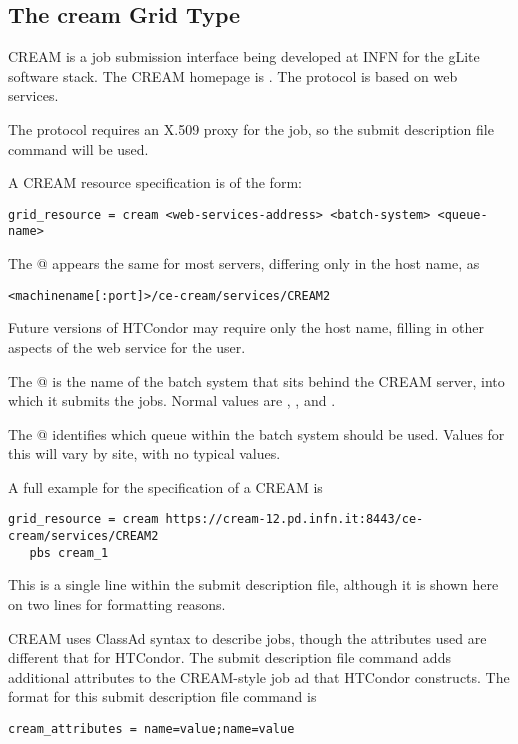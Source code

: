 
\subsection{\label{sec:CREAM}The cream Grid Type }

CREAM is a job submission interface being developed at INFN for the
gLite software stack. 
The CREAM homepage is .
The protocol is based on web services.

The protocol requires an X.509 proxy for the job,
so the submit description file command 
will be used.

A CREAM resource specification is of the form:
\footnotesize
\begin{verbatim}
grid_resource = cream <web-services-address> <batch-system> <queue-name>
\end{verbatim}
\normalsize
The @ appears the same for most servers,
differing only in the host name, as
\begin{verbatim}
<machinename[:port]>/ce-cream/services/CREAM2
\end{verbatim}
Future versions of HTCondor may require only the host name, 
filling in other aspects of the web service for the user.

The @ is the name of the batch system that sits behind
the CREAM server,
into which it submits the jobs.
Normal values are \verb@pbs@, \verb@lsf@, and \verb@condor@.

The @ identifies which queue within the batch system
should be used.
Values for this will vary by site, with no typical values.

A full example for the specification of a CREAM  is
\footnotesize
\begin{verbatim}
grid_resource = cream https://cream-12.pd.infn.it:8443/ce-cream/services/CREAM2
   pbs cream_1
\end{verbatim}
\normalsize
This is a single line within the submit description file,
although it is shown here on two lines for formatting reasons.

CREAM uses ClassAd syntax to describe jobs, though the attributes used
are different that for HTCondor.
The submit description file command
adds additional attributes to the CREAM-style job ad that HTCondor
constructs. 
The format for this submit description file command is
\begin{verbatim}
cream_attributes = name=value;name=value
\end{verbatim}
